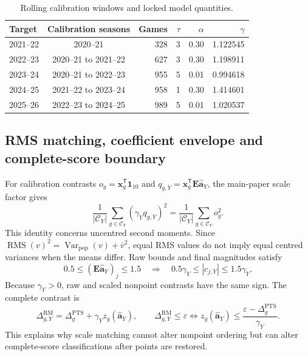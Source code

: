 \documentclass[pdflatex,sn-mathphys-num]{sn-jnl}
\begin{document}
\begin{table}[t]
\caption{Rolling calibration windows and locked model quantities.}
\label{tab:s-models}
\centering
\small
\begin{tabular}{@{}lcrrrr@{}}
\toprule
Target & Calibration seasons & Games & \(\tau\) & \(\alpha\) & \(\gamma\) \\
\midrule
2021--22 & 2020--21 & 328 & 3 & 0.30 & 1.122545 \\
2022--23 & 2020--21 to 2021--22 & 627 & 3 & 0.30 & 1.198911 \\
2023--24 & 2020--21 to 2022--23 & 955 & 5 & 0.01 & 0.994618 \\
2024--25 & 2021--22 to 2023--24 & 958 & 1 & 0.30 & 1.414601 \\
2025--26 & 2022--23 to 2024--25 & 989 & 5 & 0.01 & 1.020537 \\
\bottomrule
\end{tabular}
\end{table}

\subsection{RMS matching, coefficient envelope and complete-score boundary}

For calibration contrasts \(o_g=\mathbf x_g^{\mathsf T}\mathbf1_{10}\) and \(q_{g,Y}=\mathbf x_g^{\mathsf T}\mathbf E\widehat{\mathbf a}_Y\), the main-paper scale factor gives
\begin{equation}
\frac{1}{|\mathcal C_Y|}\sum_{g\in\mathcal C_Y}(\gamma_Yq_{g,Y})^2
=\frac{1}{|\mathcal C_Y|}\sum_{g\in\mathcal C_Y}o_g^2.
\label{eq:s-rms}
\end{equation}
This identity concerns uncentred second moments. Since \(\operatorname{RMS}(v)^2=\operatorname{Var}_{\mathrm{pop}}(v)+\bar v^2\), equal RMS values do not imply equal centred variances when the means differ. Raw bounds and final magnitudes satisfy
\begin{equation}
0.5\leq(\mathbf E\widehat{\mathbf a}_Y)_j\leq1.5
\quad\Longrightarrow\quad
0.5\gamma_Y\leq|c_{j,Y}|\leq1.5\gamma_Y.
\label{eq:s-envelope}
\end{equation}
Because \(\gamma_Y>0\), raw and scaled nonpoint contrasts have the same sign. The complete contrast is
\begin{equation}
\Delta_{g,Y}^{\mathrm{RM}}=\Delta_g^{\mathrm{PTS}}+\gamma_Yz_g(\widehat{\mathbf a}_Y),
\qquad
\Delta_{g,Y}^{\mathrm{RM}}\leq\varepsilon
\Longleftrightarrow
z_g(\widehat{\mathbf a}_Y)\leq\frac{\varepsilon-\Delta_g^{\mathrm{PTS}}}{\gamma_Y}.
\label{eq:s-boundary}
\end{equation}
This explains why scale matching cannot alter nonpoint ordering but can alter complete-score classifications after points are restored.
\end{document}

